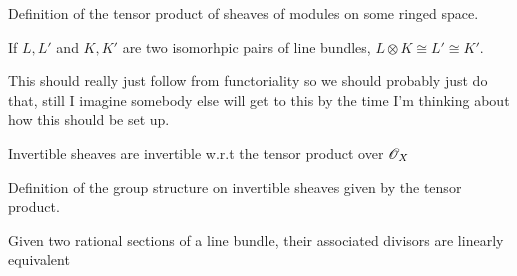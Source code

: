 \begin{definition}
  \label{def:sheaftensorproduct}
  Definition of the tensor product of sheaves of modules on some ringed space.
\end{definition}

\begin{lemma}
  \label{lem:tensorpreservesiso}
  If $L, L'$ and $K, K'$ are two isomorhpic pairs of line bundles, $L \otimes K \cong L' \cong K'$. 

  This should really just follow from functoriality so we should probably just do that,
  still I imagine somebody else will get to this by the time I'm thinking about how this
  should be set up.
\end{lemma}

\begin{lemma}
  \label{lem:invertiblesheavesinvertible}
  Invertible sheaves are invertible w.r.t the tensor product over $\mathscr{O}_X$
\end{lemma}

\begin{definition}
  \label{def:picardgroup}
  Definition of the group structure on invertible sheaves given by the tensor product.
\end{definition}


\begin{definition}
  \label{def:sheafoftotalquotientrings}
\end{definition}

\begin{definition}
  \label{def:rationalsection}
\end{definition}

\begin{definition}
  \label{def:divisorofrationalsection}
\end{definition}


\begin{theorem}
  \label{thm:sectiondivisorrational}
  Given two rational sections of a line bundle, their associated divisors are linearly equivalent
\end{theorem}

